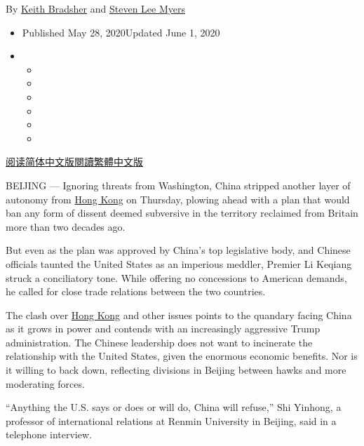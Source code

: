 By \href{https://www.nytimes3xbfgragh.onion/by/keith-bradsher}{Keith
Bradsher} and
\href{https://www.nytimes3xbfgragh.onion/by/steven-lee-myers}{Steven Lee
Myers}

\begin{itemize}
\item
  Published May 28, 2020Updated June 1, 2020
\item
  \begin{itemize}
  \item
  \item
  \item
  \item
  \item
  \item
  \end{itemize}
\end{itemize}

\href{https://cn.nytimes3xbfgragh.onion/china/20200529/china-united-states/}{阅读简体中文版}\href{https://cn.nytimes3xbfgragh.onion/china/20200529/china-united-states/zh-hant}{閱讀繁體中文版}

BEIJING --- Ignoring threats from Washington, China stripped another
layer of autonomy from
\href{https://www.nytimes3xbfgragh.onion/2020/06/01/world/asia/Hong-kong-Tiananmen-vigil-banned.html}{Hong
Kong} on Thursday, plowing ahead with a plan that would ban any form of
dissent deemed subversive in the territory reclaimed from Britain more
than two decades ago.

But even as the plan was approved by China's top legislative body, and
Chinese officials taunted the United States as an imperious meddler,
Premier Li Keqiang struck a conciliatory tone. While offering no
concessions to American demands, he called for close trade relations
between the two countries.

The clash over
\href{https://www.nytimes3xbfgragh.onion/2020/06/01/world/asia/Hong-kong-Tiananmen-vigil-banned.html}{Hong
Kong} and other issues points to the quandary facing China as it grows
in power and contends with an increasingly aggressive Trump
administration. The Chinese leadership does not want to incinerate the
relationship with the United States, given the enormous economic
benefits. Nor is it willing to back down, reflecting divisions in
Beijing between hawks and more moderating forces.

``Anything the U.S. says or does or will do, China will refuse,'' Shi
Yinhong, a professor of international relations at Renmin University in
Beijing, said in a telephone interview.

